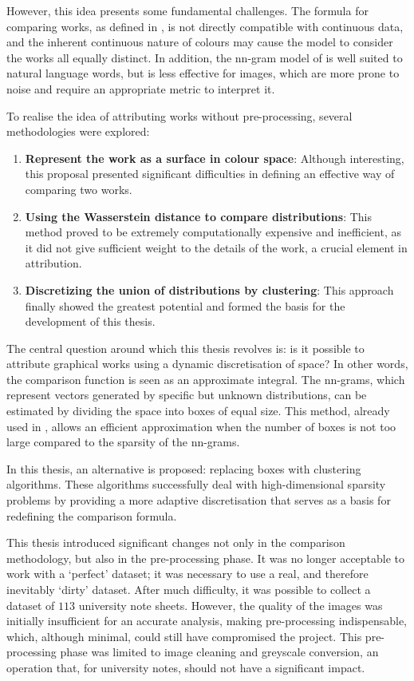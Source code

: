 \begin{toReview}
		\noindent However, this idea presents some fundamental challenges. The formula for comparing works, as defined in \cite{SapAttribution}, is not directly compatible with continuous data, and the inherent continuous nature of colours may cause the model to consider the works all equally distinct. In addition, the nn-gram model of \citeauthor{Shannon_ngrammodel} is well suited to natural language words, but is less effective for images, which are more prone to noise and require an appropriate metric to interpret it.

		\bigskip \noindent To realise the idea of attributing works without pre-processing, several methodologies were explored:

		\begin{enumerate}
			\item \textbf{Represent the work as a surface in colour space}: Although interesting, this proposal presented significant difficulties in defining an effective way of comparing two works.
			\item \textbf{Using the Wasserstein distance to compare distributions}: This method proved to be extremely computationally expensive and inefficient, as it did not give sufficient weight to the details of the work, a crucial element in attribution.
			\item \textbf{Discretizing the union of distributions by clustering}: This approach finally showed the greatest potential and formed the basis for the development of this thesis.
		\end{enumerate}

		\noindent The central question around which this thesis revolves is: is it possible to attribute graphical works using a dynamic discretisation of space? In other words, the comparison function is seen as an approximate integral. The nn-grams, which represent vectors generated by specific but unknown distributions, can be estimated by dividing the space into boxes of equal size. This method, already used in \cite{thesis}, allows an efficient approximation when the number of boxes is not too large compared to the sparsity of the nn-grams.

		\noindent In this thesis, an alternative is proposed: replacing boxes with clustering algorithms. These algorithms successfully deal with high-dimensional sparsity problems by providing a more adaptive discretisation that serves as a basis for redefining the comparison formula.

		\bigskip \noindent This thesis introduced significant changes not only in the comparison methodology, but also in the pre-processing phase. It was no longer acceptable to work with a ‘perfect’ dataset; it was necessary to use a real, and therefore inevitably ‘dirty’ dataset. After much difficulty, it was possible to collect a dataset of $113$ university note sheets. However, the quality of the images was initially insufficient for an accurate analysis, making pre-processing indispensable, which, although minimal, could still have compromised the project. This pre-processing phase was limited to image cleaning and greyscale conversion, an operation that, for university notes, should not have a significant impact.


\end{toReview}
